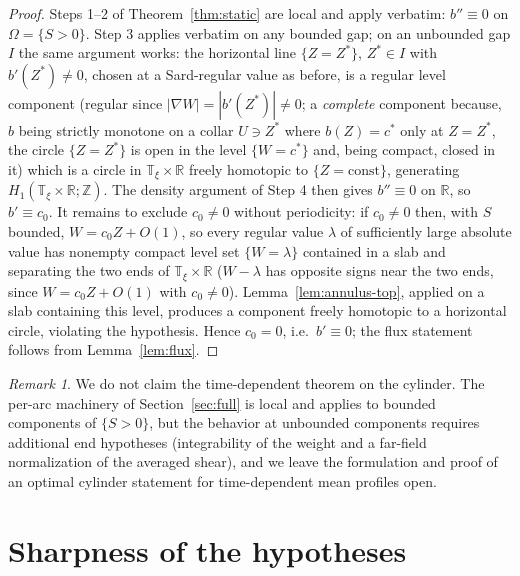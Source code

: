 \documentclass[11pt]{amsart}
\theoremstyle{definition}
\theoremstyle{remark}
\newtheorem{remark}[theorem]{Remark}
\newcommand{\T}{\mathbb{T}}
\newcommand{\R}{\mathbb{R}}
\begin{document}
\begin{proof}
Steps 1--2 of Theorem~\ref{thm:static} are local and apply verbatim:
$b''\equiv0$ on $\Omega=\{S>0\}$. Step 3 applies verbatim on any
bounded gap; on an unbounded gap $I$ the same argument works: the
horizontal line $\{Z=Z^*\}$, $Z^*\in I$ with $b'(Z^*)\neq0$, chosen at
a Sard-regular value as before, is a regular level component (regular
since $|\nabla W|=|b'(Z^*)|\neq0$; a \emph{complete} component because,
$b$ being strictly monotone on a collar $U\ni Z^*$ where $b(Z)=c^*$ only
at $Z=Z^*$, the circle $\{Z=Z^*\}$ is open in the level $\{W=c^*\}$ and,
being compact, closed in it) which is a circle in
$\T_\xi\times\R$ freely homotopic to $\{Z=\mathrm{const}\}$, generating
$H_1(\T_\xi\times\R;\mathbb Z)$.
The density argument of Step 4 then gives $b''\equiv0$ on $\R$, so
$b'\equiv c_0$. It remains to exclude $c_0\neq0$ without periodicity:
if $c_0\neq0$ then, with $S$ bounded, $W=c_0Z+O(1)$, so every regular
value $\lambda$ of sufficiently large absolute value has nonempty
compact level set $\{W=\lambda\}$ contained in a slab and separating
the two ends of $\T_\xi\times\R$ ($W-\lambda$ has opposite signs near
the two ends, since $W=c_0Z+O(1)$ with $c_0\neq0$).
Lemma~\ref{lem:annulus-top}, applied on a slab containing this level,
produces a component freely homotopic to a horizontal circle, violating
the hypothesis. Hence $c_0=0$, i.e.\ $b'\equiv0$; the flux statement follows from
Lemma~\ref{lem:flux}.
\end{proof}

\begin{remark}\label{rem:cylinder-full}
We do not claim the time-dependent theorem on the cylinder. The
per-arc machinery of Section~\ref{sec:full} is local and applies to
bounded components of $\{S>0\}$, but the behavior at unbounded
components requires additional end hypotheses (integrability of the
weight and a far-field normalization of the averaged shear), and we
leave the formulation and proof of an optimal cylinder statement for
time-dependent mean profiles open.
\end{remark}

\section{Sharpness of the hypotheses}\label{sec:sharpness}
\end{document}
